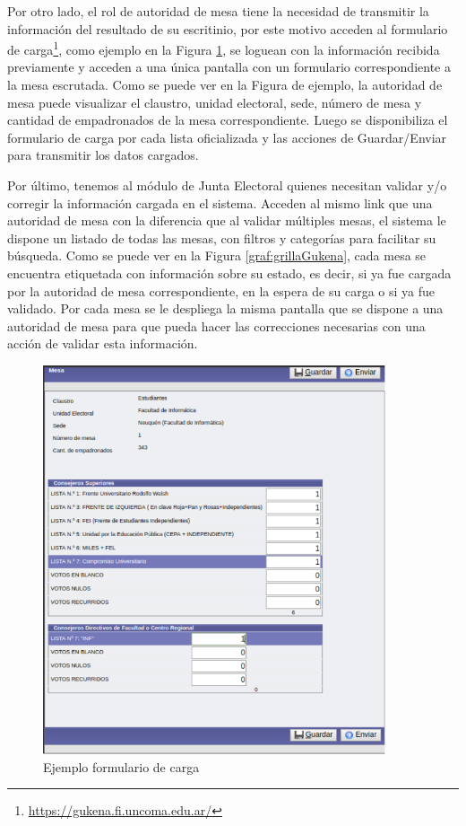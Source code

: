Por otro lado, el rol de autoridad de mesa tiene la necesidad de transmitir la información del resultado de su escritinio, por este motivo acceden al formulario de carga\footnote{\url{https://gukena.fi.uncoma.edu.ar/}}, como ejemplo en la Figura \ref{graf:formularioGukena}, se loguean con la información recibida previamente y acceden a una única pantalla con un formulario correspondiente a la mesa escrutada. 
Como se puede ver en la Figura de ejemplo, la autoridad de mesa puede visualizar el claustro, unidad electoral, sede, número de mesa y cantidad de empadronados de la mesa correspondiente. Luego se disponibiliza el formulario de carga por cada lista oficializada y las acciones de Guardar/Enviar para transmitir los datos cargados.

Por último, tenemos al módulo de Junta Electoral quienes necesitan validar y/o corregir la información cargada en el sistema. Acceden al mismo link que una autoridad de mesa con la diferencia que al validar múltiples mesas, el sistema le dispone un listado de todas las mesas, con filtros y categorías para facilitar su búsqueda. 
Como se puede ver en la Figura \ref{graf:grillaGukena}, cada mesa se encuentra etiquetada con información sobre su estado, es decir, si ya fue cargada por la autoridad de mesa correspondiente, en la espera de su carga o si ya fue validado. Por cada mesa se le despliega la misma pantalla que se dispone a una autoridad de mesa para que pueda hacer las correcciones necesarias con una acción de validar esta información. \newline

\begin{figure}[h!]
    \begin{center}
        \includegraphics[width=0.9\textwidth]{img/jvFvvu4LpJ.png}
    \end{center}
  \caption{Ejemplo formulario de carga}
  \label{graf:formularioGukena}
\end{figure}

